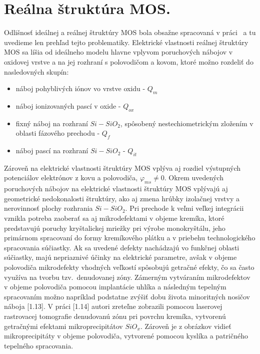 \section{Reálna štruktúra MOS.}

Odlišnosť ideálnej a reálnej štruktúry MOS bola obsažne spracovaná v
práci~\cite{1.12} a tu uvedieme len prehľad tejto
problematiky. Elektrické vlastnosti reálnej štruktúry MOS sa líšia od
ideálneho modelu hlavne vplyvom poruchových nábojov v oxidovej vrstve
a na jej rozhraní s polovodičom a kovom, ktoré možno rozdeliť do
nasledovných skupín:

\begin{itemize}
\item náboj pohyblivých iónov vo vrstve oxidu - $Q_{m}$
\item náboj ionizovaných pascí v oxide - $Q_{ox}$
\item fixný náboj na rozhraní $Si-SiO_2$, spôsobený nestechiometrickým
  zložením v oblasti fázového prechodu - $Q_f$
\item náboj pascí na rozhraní $Si-SiO_2$ - $Q_{it}$
\end{itemize}

\par Zároveň na elektrické vlastnosti štruktúry MOS vplýva aj rozdiel
výstupných potenciálov elektrónov z kovu a polovodiča,
$\varphi_{ms}\neq{0}$.  Okrem uvedených poruchových nábojov na
elektrické vlastnosti štruktúry MOS vplývajú aj geometrické
nedokonalosti štruktúry, ako aj zmena hrúbky izolačnej vrstvy a
nerovinnosť plochy rozhrania $Si-SiO_2$. Pri prechode k veľmi veľkej
integrácii vznikla potreba zaoberať sa aj mikrodefektami v objeme
kremíka, ktoré predstavujú poruchy kryštalickej mriežky pri výrobe
monokryštálu, jeho primárnom spracovaní do formy kremíkového plátku a
v priebehu technologického spracovania súčiastky. Ak sa uvedené
defekty nachádzajú vo funkčnej oblasti súčiastky, majú nepriaznivé
účinky na elektrické parametre, avšak v objeme polovodiča mikrodefekty
vhodných veľkostí spôsobujú getračné efekty, čo sa často využíva na
tvorbu tzv.\ denudovanej zóny.  Zámerným vytváraním mikrodefektov v
objeme polovodiča pomocou implantácie uhlíka a následným tepelným
spracovaním možno napríklad podstatne zvýšiť dobu života minoritných
nosičov náboja [1.13]. V práci [1.14] autori zreteľne zobrazili
pomocou laserovej rastrovacej tomografie denudovanú zónu pri povrchu
kremíka, vytvorenú getračnými efektami mikroprecipitátov
$SiO_x$. Zároveň je z obrázkov vidieť mikroprecipitáty v objeme
polovodiča, vytvorené pomocou kyslíka a patričného tepelného
spracovania.

